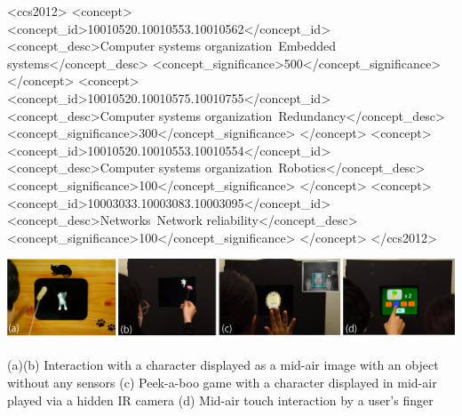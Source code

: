 \documentclass[sigconf]{acmart}
\begin{document}
\begin{CCSXML}
<ccs2012>
 <concept>
  <concept_id>10010520.10010553.10010562</concept_id>
  <concept_desc>Computer systems organization~Embedded systems</concept_desc>
  <concept_significance>500</concept_significance>
 </concept>
 <concept>
  <concept_id>10010520.10010575.10010755</concept_id>
  <concept_desc>Computer systems organization~Redundancy</concept_desc>
  <concept_significance>300</concept_significance>
 </concept>
 <concept>
  <concept_id>10010520.10010553.10010554</concept_id>
  <concept_desc>Computer systems organization~Robotics</concept_desc>
  <concept_significance>100</concept_significance>
 </concept>
 <concept>
  <concept_id>10003033.10003083.10003095</concept_id>
  <concept_desc>Networks~Network reliability</concept_desc>
  <concept_significance>100</concept_significance>
 </concept>
</ccs2012>
\end{CCSXML}



\begin{teaserfigure}
  \includegraphics[width=\textwidth]{images/teaser.png}
  \vspace{-2\baselineskip}
  \caption{(a)(b) Interaction with a character displayed as a mid-air image with an object without any sensors (c) Peek-a-boo game with a character displayed in mid-air played via a hidden IR camera (d) Mid-air touch interaction by a user's finger}
  \vspace{0.5\baselineskip}
  \label{teaser}
\end{teaserfigure}
\end{document}

